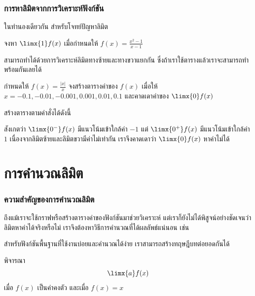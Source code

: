 \begin{frame}
\frametitle{การหาลิมิตจากการวิเคราะห์ฟังก์ชัน}
ในทำนองเดียวกัน สำหรับโจทย์ปัญหาลิมิต
\begin{remark}{}
\begin{center}
จงหา $\limx{1} f(x)$ เมื่อกำหนดให้ $f(x) = \frac{x^2-1}{x-1}$
\end{center}
\end{remark}

สามารถทำได้ด้วยการวิเคราะห์ลิมิตทางซ้ายและทางขวาแยกกัน ซึ่งถ้าเราใช้ตารางแล้วเราจะสามารถทำพร้อมกันเลยได้
\end{frame}

\begin{frame}[t]
\begin{ex}
กำหนดให้ $f(x) = \frac{|x|}{x} $ จงสร้างตารางค่าของ $f(x)$ เมื่อให้ $x = -0.1, -0.01, -0.001, 0.001, 0.01, 0.1$ และคาดเดาค่าของ $\limx{0}f(x)$ 
\end{ex}
\begin{sol}
สร้างตารางตามคำสั่งได้ดังนี้
\begin{table}[h!]
\centering
{}
\end{table} 
สังเกตว่า $\limx{0^{-}} f(x)$ มีแนวโน้มเข้าใกล้ค่า $-1$ แต่ $\limx{0^{+}} f(x)$ มีแนวโน้มเข้าใกล้ค่า $1$ เนื่องจากลิมิตซ้ายและลิมิตขวามีค่าไม่เท่ากัน เราจึงคาดเดาว่า $\limx{0} f(x)$ หาค่าไม่ได้
\end{sol}
\end{frame}



\section{การคำนวณลิมิต}
\frame{\sectionpage}

\begin{frame}[t]
\frametitle{ความสำคัญของการคำนวณลิมิต}
ถึงแม้เราจะใช้กราฟหรือสร้างตารางค่าของฟังก์ชันมาช่วยวิเคราะห์ แต่เราก็ยังไม่ได้พิสูจน์อย่างชัดเจนว่าลิมิตหาค่าได้จริงหรือไม่ เราจึงต้องหาวิธีการคำนวณที่ได้ผลลัพธ์แน่นอน เช่น

\medskip

สำหรับฟังก์ชันพื้นฐานที่ใช้งานบ่อยและคำนวณได้ง่าย เราสามารถสร้างทฤษฎีบทต่อยอดกันได้ 

พิจารณา 
\[\limx{a} f(x)\]
เมื่อ $f(x)$ เป็นค่าคงตัว และเมื่อ $f(x) = x$
\end{frame}

